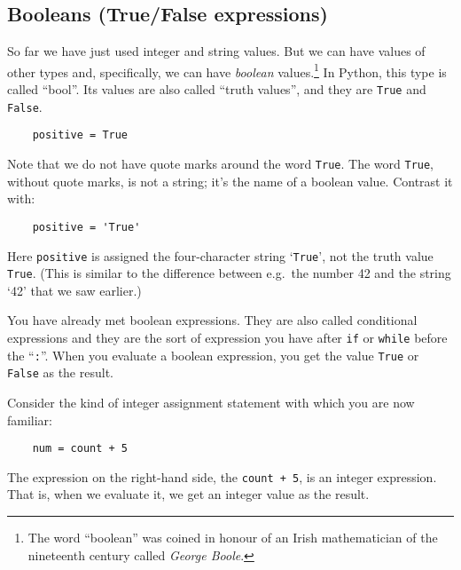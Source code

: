 \pagebreak

\subsection{Booleans (True/False expressions)}

So far we have just used integer and string values.  But we can
have values of other types and, specifically, we can have
\emph{boolean} values.\footnote{The word ``boolean'' was coined in honour of an
Irish mathematician of the nineteenth century called \emph{George Boole}.}
In Python, this type is called ``bool''. Its values are also called
``truth values'', and they are
\texttt{True} and \texttt{False}.

\begin{Verbatim}
    positive = True
\end{Verbatim}

Note that we do not have quote marks around the word \texttt{True}.  
The word \texttt{True}, without quote marks, is not a string; it's the name of a
boolean value.  Contrast it with:

\begin{Verbatim}
    positive = 'True'
\end{Verbatim}

Here \texttt{positive} is assigned
the four-character string `\texttt{True}', not the truth value
\texttt{True}. (This is similar to the difference between e.g.\ the
number 42 and the string `42' that we saw earlier.)

You have already met boolean expressions.  They are also called conditional
expressions and they are the sort of expression you have
after \texttt{if} or \texttt{while} before the ``\texttt{:}''.
When you evaluate a boolean expression,
you get the value \texttt{True} or \texttt{False} as the result.

Consider the kind of integer assignment statement with which you are
now familiar:

\begin{Verbatim}
    num = count + 5
\end{Verbatim}

The expression on the right-hand side, the \texttt{count + 5}, is an
integer expression.  That is, when we evaluate it, we get an integer value
as the result.

